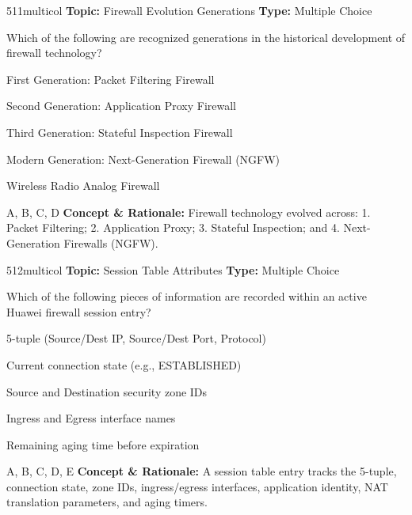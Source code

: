 \begin{qcard}{511}{multicol}
\textcolor{darkslate!75}{\small\textbf{Topic:} Firewall Evolution Generations \hfill \textbf{Type:} Multiple Choice}\vspace{0.4em}\par
Which of the following are recognized generations in the historical development of firewall technology?
\begin{qoptions}
\item First Generation: Packet Filtering Firewall
\item Second Generation: Application Proxy Firewall
\item Third Generation: Stateful Inspection Firewall
\item Modern Generation: Next-Generation Firewall (NGFW)
\item Wireless Radio Analog Firewall
\end{qoptions}
\end{qcard}
\nopagebreak
\begin{explainbox}{A, B, C, D}
\textbf{Concept \& Rationale:} Firewall technology evolved across: 1. Packet Filtering; 2. Application Proxy; 3. Stateful Inspection; and 4. Next-Generation Firewalls (NGFW).
\end{explainbox}

\begin{qcard}{512}{multicol}
\textcolor{darkslate!75}{\small\textbf{Topic:} Session Table Attributes \hfill \textbf{Type:} Multiple Choice}\vspace{0.4em}\par
Which of the following pieces of information are recorded within an active Huawei firewall session entry?
\begin{qoptions}
\item 5-tuple (Source/Dest IP, Source/Dest Port, Protocol)
\item Current connection state (e.g., ESTABLISHED)
\item Source and Destination security zone IDs
\item Ingress and Egress interface names
\item Remaining aging time before expiration
\end{qoptions}
\end{qcard}
\nopagebreak
\begin{explainbox}{A, B, C, D, E}
\textbf{Concept \& Rationale:} A session table entry tracks the 5-tuple, connection state, zone IDs, ingress/egress interfaces, application identity, NAT translation parameters, and aging timers.
\end{explainbox}

